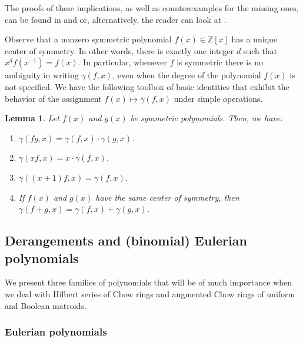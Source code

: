 \documentclass[11pt, a4paper, english]{amsart}
\theoremstyle{teoremas}
\newtheorem{lemma}[theorem]{Lemma}
\theoremstyle{definition}
\begin{document}
The proofs of these implications, as well as counterexamples for the missing ones, can be found in \cite{gal} and \cite{branden} or, alternatively, the reader can look at \cite[Proposition~5.3]{ferroni-nasr-vecchi}.

Observe that a nonzero symmetric polynomial $f(x)\in \mathbb{Z}[x]$ has a unique center of symmetry. In other words, there is exactly one integer $d$ such that $x^df(x^{-1}) = f(x)$. In particular, whenever $f$ is symmetric there is no ambiguity in writing $\gamma(f,x)$, even when the degree of the polynomial $f(x)$ is not specified. We have the following toolbox of basic identities that exhibit the behavior of the assignment $f(x) \mapsto \gamma(f,x)$ under simple operations.

\begin{lemma}\label{lemma:properties-gamma}
    Let $f(x)$ and $g(x)$ be symmetric polynomials. Then, we have:
    \begin{enumerate}[\normalfont(i)]
        \item $\gamma(fg, x) = \gamma(f,x)\cdot\gamma(g,x)$.
        \item $\gamma(xf, x) = x\cdot\gamma(f,x)$.
        \item $\gamma((x+1)f, x) = \gamma(f,x)$.
        \item If $f(x)$ and $g(x)$ have the same center of symmetry, then $\gamma(f+g,x) = \gamma(f,x) + \gamma(g,x)$.
    \end{enumerate}
\end{lemma}

\subsection{Derangements and (binomial) Eulerian polynomials}

We present three families of polynomials that will be of much importance when we deal with Hilbert series of Chow rings and augmented Chow rings of uniform and Boolean matroids.

\subsubsection{Eulerian polynomials} 
\end{document}
